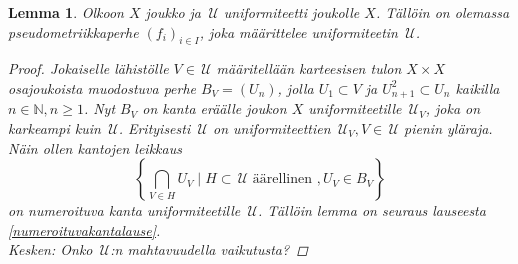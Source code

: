 \documentclass[12pt,a4paper,leqno]{report}
\newcommand{\N}{\mathbb{N}}
\newcommand{\U}{\,\mathcal{U}}
\theoremstyle{plain}
\newtheorem{lem}[equation]{Lemma}
\theoremstyle{definition}
\theoremstyle{remark}
\begin{document}
\begin{lem}\label{pseudo_uniformista}
Olkoon $X$ joukko ja $\U$ uniformiteetti joukolle $X$. 
Tällöin on olemassa pseudometriikkaperhe $(f_i)_{i\in I}$, joka määrittelee uniformiteetin $\U$.
\begin{proof}
Jokaiselle lähistölle $V\in\U$ määritellään karteesisen tulon $X\times X$ osajoukoista muodostuva perhe $B_V=(U_n)$, 
jolla $U_1\subset V$ ja $U_{n+1}^2\subset U_n$ kaikilla $n\in\N, n\geq 1$. 
Nyt $B_V$ on kanta eräälle joukon $X$ uniformiteetille $\U_V$, 
joka on karkeampi kuin $\U$. 
Erityisesti $\U$ on uniformiteettien 
$\U_V,V\in\U$ pienin yläraja. %
Näin ollen kantojen leikkaus
$$\left\{\bigcap_{V\in H}U_V\mid H\subset\U \text{ äärellinen }, U_V\in B_V\right\}$$
on numeroituva kanta uniformiteetille $\U$.
Tällöin lemma on seuraus lauseesta \ref{numeroituvakantalause}.
\\Kesken: Onko $\U$:n mahtavuudella vaikutusta?
\end{proof}
\end{lem}
\end{document}
